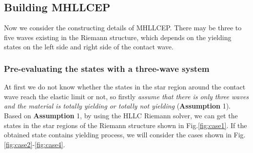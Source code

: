 \documentclass[review]{elsarticle}
\begin{document}
\subsection{Building MHLLCEP}

Now we consider the constructing details of MHLLCEP. There may be three to five waves existing  in the Riemann structure, which depends on the yielding states  on the left side and right side of the contact wave.

\subsubsection{Pre-evaluating the states with a three-wave system}\label{sec:case1}
At first we do not know whether the states in the star region around the contact wave reach the elastic limit or not, so firstly \emph{assume that there is only three waves and the material is totally yielding or totally not yielding} (\textbf{Assumption} 1). Based on \textbf{Assumption} 1, by using the HLLC Riemann solver, we can get the states in the star regions of the Riemann structure shown in  Fig.\ref{fig:case1}. If the obtained state contains yielding process, we will consider the cases shown in Fig.\ref{fig:case2}-\ref{fig:case4}.
\end{document}
